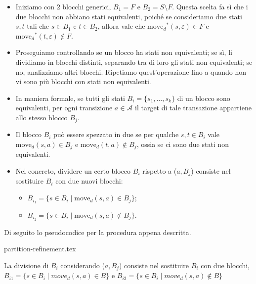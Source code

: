 \documentclass[class=book, crop=false, oneside, 12pt]{standalone}
\begin{document}
\begin{itemize}
    \item Iniziamo con \(2\) blocchi generici, \(B_{1}=F\) e \(B_{2}=S\setminus F\). Questa scelta fa sì che i due blocchi non abbiano stati equivalenti, poiché se consideriamo due stati \(s, t\) tali che \(s\in B_{1}\) e \(t\in B_{2}\), allora vale che \(\textrm{move}_{d}\!^{*}(s,\varepsilon)\in F\) e \(\textrm{move}_{d}\!^{*}(t,\varepsilon)\notin F\).
    \item Proseguiamo controllando se un blocco ha stati non equivalenti; se sì, li dividiamo in blocchi distinti, separando tra di loro gli stati non equivalenti; se no, analizziamo altri blocchi. Ripetiamo quest'operazione fino a quando non vi sono più blocchi con stati non equivalenti.
    \item In maniera formale, se tutti gli stati \(B_{i}=\{s_{1}, \ldots, s_{k}\}\) di un blocco sono equivalenti, per ogni transizione \(a \in \mathcal{A}\) il target di tale transazione appartiene allo stesso blocco \(B_j\).
    \item Il blocco \(B_{i}\) può essere spezzato in due se per qualche \(s,t \in B_{i}\) vale \(\textrm{move}_{d}(s,a)\in B_{j}\) e \(\textrm{move}_{d}(t,a)\notin B_{j}\), ossia se ci sono due stati non equivalenti.
    \item Nel concreto, dividere un certo blocco \(B_{i}\) rispetto a (\(a,B_{j}\)) consiste nel sostituire \(B_{i}\) con due nuovi blocchi:
    \begin{itemize}
        \item \( B_{i_1} = \{s \in B_{i} \mid \textrm{move}_{d}(s,a)\in B_j\}\);
        \item \( B_{i_2} = \{s \in B_{i} \mid \textrm{move}_{d}(s,a)\notin B_j\}\).
    \end{itemize}
\end{itemize}
Di seguito lo pseudocodice per la procedura appena descritta.

{partition-refinement.tex}

La divisione di \(B_{i}\) considerando (\(a,B_{j}\)) consiste nel sostituire \(B_{i}\) con due blocchi, \( B_{i1} = \{s \in B_{i} \mid move_{d}(s,a)\in B\}\) e \( B_{i2} = \{s \in B_{i} \mid move_{d}(s,a)\notin B\}\)
\end{document}
